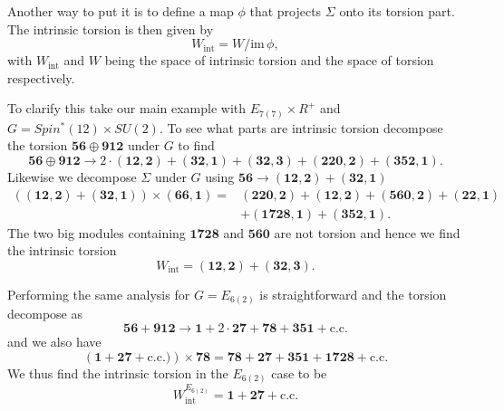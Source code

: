 Another way to put it is to define a map $\phi$ that projects $\Sigma$ onto its torsion part. The intrinsic torsion is then given by 
\begin{equation}
    W_{\text{int}} = W/\text{im}\,\phi,
\end{equation}
with $W_{\text{int}}$ and $W$ being the space of intrinsic torsion and the space of torsion respectively. 

To clarify this take our main example with $E_{7(7)}\times R^+$ and $G=Spin^*(12)\times SU(2)$. To see what parts are intrinsic torsion decompose the torsion $\mathbf{56}\oplus\mathbf{912}$ under $G$ to find 
\begin{equation}
    \mathbf{56}\oplus\mathbf{912} \to 2\cdot (\mathbf{12},\mathbf{2})+(\mathbf{32},\mathbf{1})+(\mathbf{32},\mathbf{3})+(\mathbf{220},\mathbf{2})+(\mathbf{352},\mathbf{1}).
\end{equation}
Likewise we decompose $\Sigma$ under $G$ using $\mathbf{56}\to (\mathbf{12},\mathbf{2})+(\mathbf{32},\mathbf{1})$ 
\begin{equation}
    \begin{aligned}
        \left((\mathbf{12},\mathbf{2})+(\mathbf{32},\mathbf{1})\right)\times (\mathbf{66},\mathbf{1})=&(\mathbf{220},\mathbf{2})+(\mathbf{12},\mathbf{2})+(\mathbf{560},\mathbf{2})+(\mathbf{22},\mathbf{1})\\
        &+(\mathbf{1728},\mathbf{1})+(\mathbf{352},\mathbf{1}).
    \end{aligned}
\end{equation}
The two big modules containing $\mathbf{1728}$ and $\mathbf{560}$ are not torsion and hence we find the intrinsic torsion 
\begin{equation}
    W_{\text{int}} = (\mathbf{12},\mathbf{2})+(\mathbf{32},\mathbf{3}).
\end{equation}

Performing the same analysis for $G=E_{6(2)}$ is straightforward and the torsion decompose as
\begin{equation}
    \mathbf{56}+\mathbf{912}\to \mathbf{1}+2\cdot\mathbf{27}+\mathbf{78}+\mathbf{351}+\text{c.c.}
\end{equation}
and we also have 
\begin{equation}
    \left(\mathbf{1}+\mathbf{27}+\text{c.c.})\right)\times \mathbf{78} = \mathbf{78}+\mathbf{27}+\mathbf{351}+\mathbf{1728}+\text{c.c.}
\end{equation}
We thus find the intrinsic torsion in the $E_{6(2)}$ case to be 
\begin{equation}
    W_{\text{int}}^{E_{6(2)}} = \textbf{1}+\mathbf{27}+\text{c.c.}
\end{equation}


